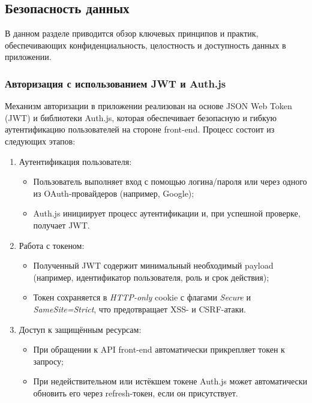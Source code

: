 \subsection{Безопасность данных}

В данном разделе приводится обзор ключевых принципов и практик, обеспечивающих конфиденциальность, целостность и доступность данных в приложении.

\subsubsection{Авторизация с использованием JWT и Auth.js}
Механизм авторизации в приложении реализован на основе JSON Web Token (JWT) и библиотеки Auth.js, которая обеспечивает безопасную и гибкую аутентификацию пользователей на стороне front-end. Процесс состоит из следующих этапов:
\begin{enumerate}
  \item Аутентификация пользователя:
    \begin{itemize}
      \item Пользователь выполняет вход с помощью логина/пароля или через одного из OAuth-провайдеров (например, Google);
      \item Auth.js инициирует процесс аутентификации и, при успешной проверке, получает JWT.
    \end{itemize}
  \item Работа с токеном:
    \begin{itemize}
      \item Полученный JWT содержит минимальный необходимый payload (например, идентификатор пользователя, роль и срок действия);
      \item Токен сохраняется в \textit{HTTP-only} cookie с флагами \textit{Secure} и \textit{SameSite=Strict}, что предотвращает XSS- и CSRF-атаки.
    \end{itemize}
  \item Доступ к защищённым ресурсам:
    \begin{itemize}
      \item При обращении к API front-end автоматически прикрепляет токен к запросу;
      \item При недействительном или истёкшем токене Auth.js может автоматически обновить его через refresh-токен, если он присутствует.
    \end{itemize}
\end{enumerate}

